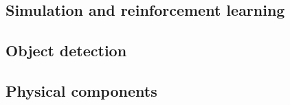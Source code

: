\documentclass[../main.tex]{subfiles}
\begin{document}
\subsection{Simulation and reinforcement learning}

\lipsum[1]

\subsection{Object detection}

\lipsum[1]

\subsection{Physical components}

\lipsum[1]
\end{document}
